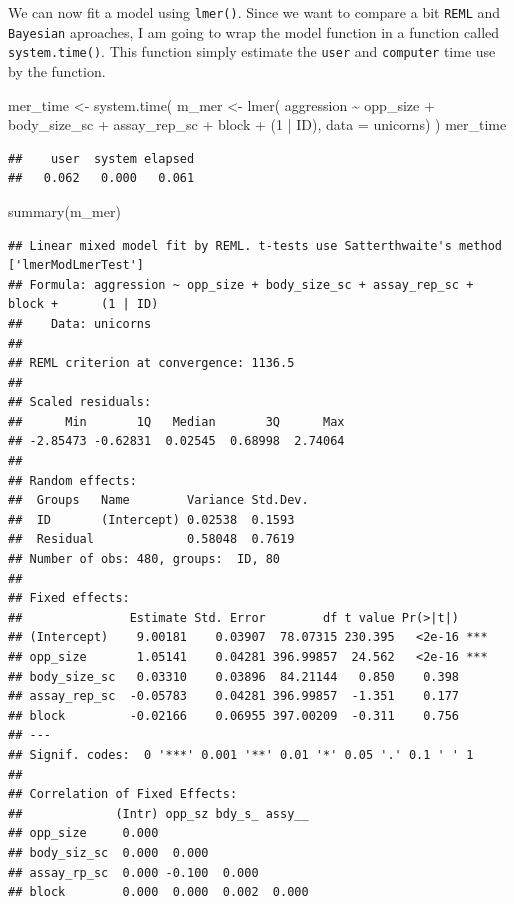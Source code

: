 \documentclass[
  12pt,
]{book}
\newenvironment{Shaded}{\begin{snugshade}}{\end{snugshade}}
\newcommand{\AttributeTok}[1]{\textcolor[rgb]{0.77,0.63,0.00}{#1}}
\newcommand{\DecValTok}[1]{\textcolor[rgb]{0.00,0.00,0.81}{#1}}
\newcommand{\FunctionTok}[1]{\textcolor[rgb]{0.00,0.00,0.00}{#1}}
\newcommand{\NormalTok}[1]{#1}
\newcommand{\OtherTok}[1]{\textcolor[rgb]{0.56,0.35,0.01}{#1}}
\newcommand{\SpecialCharTok}[1]{\textcolor[rgb]{0.00,0.00,0.00}{#1}}
\begin{document}
We can now fit a model using \texttt{lmer()}. Since we want to compare a bit \texttt{REML} and \texttt{Bayesian} aproaches, I am going to wrap the model function in a function called \texttt{system.time()}.
This function simply estimate the \texttt{user} and \texttt{computer} time use by the function.

\begin{Shaded}
\begin{Highlighting}[]
\NormalTok{mer\_time }\OtherTok{\textless{}{-}} \FunctionTok{system.time}\NormalTok{(}
\NormalTok{  m\_mer }\OtherTok{\textless{}{-}} \FunctionTok{lmer}\NormalTok{(}
\NormalTok{    aggression }\SpecialCharTok{\textasciitilde{}}\NormalTok{ opp\_size }\SpecialCharTok{+}\NormalTok{ body\_size\_sc }\SpecialCharTok{+}\NormalTok{ assay\_rep\_sc }\SpecialCharTok{+}\NormalTok{ block}
                \SpecialCharTok{+}\NormalTok{ (}\DecValTok{1} \SpecialCharTok{|}\NormalTok{ ID),}
    \AttributeTok{data =}\NormalTok{ unicorns)}
\NormalTok{)}
\NormalTok{mer\_time}
\end{Highlighting}
\end{Shaded}

\begin{verbatim}
##    user  system elapsed 
##   0.062   0.000   0.061
\end{verbatim}

\begin{Shaded}
\begin{Highlighting}[]
\FunctionTok{summary}\NormalTok{(m\_mer)}
\end{Highlighting}
\end{Shaded}

\begin{verbatim}
## Linear mixed model fit by REML. t-tests use Satterthwaite's method ['lmerModLmerTest']
## Formula: aggression ~ opp_size + body_size_sc + assay_rep_sc + block +      (1 | ID)
##    Data: unicorns
## 
## REML criterion at convergence: 1136.5
## 
## Scaled residuals: 
##      Min       1Q   Median       3Q      Max 
## -2.85473 -0.62831  0.02545  0.68998  2.74064 
## 
## Random effects:
##  Groups   Name        Variance Std.Dev.
##  ID       (Intercept) 0.02538  0.1593  
##  Residual             0.58048  0.7619  
## Number of obs: 480, groups:  ID, 80
## 
## Fixed effects:
##               Estimate Std. Error        df t value Pr(>|t|)    
## (Intercept)    9.00181    0.03907  78.07315 230.395   <2e-16 ***
## opp_size       1.05141    0.04281 396.99857  24.562   <2e-16 ***
## body_size_sc   0.03310    0.03896  84.21144   0.850    0.398    
## assay_rep_sc  -0.05783    0.04281 396.99857  -1.351    0.177    
## block         -0.02166    0.06955 397.00209  -0.311    0.756    
## ---
## Signif. codes:  0 '***' 0.001 '**' 0.01 '*' 0.05 '.' 0.1 ' ' 1
## 
## Correlation of Fixed Effects:
##             (Intr) opp_sz bdy_s_ assy__
## opp_size     0.000                     
## body_siz_sc  0.000  0.000              
## assay_rp_sc  0.000 -0.100  0.000       
## block        0.000  0.000  0.002  0.000
\end{verbatim}
\end{document}
